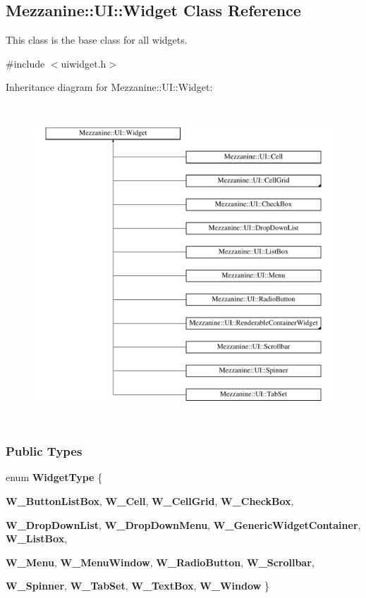 \hypertarget{classMezzanine_1_1UI_1_1Widget}{
\subsection{Mezzanine::UI::Widget Class Reference}
\label{classMezzanine_1_1UI_1_1Widget}
}


This class is the base class for all widgets.  




{\ttfamily \#include $<$uiwidget.h$>$}

Inheritance diagram for Mezzanine::UI::Widget:\begin{figure}[H]
\begin{center}
\leavevmode
\includegraphics[height=12.000000cm]{classMezzanine_1_1UI_1_1Widget}
\end{center}
\end{figure}
\subsubsection*{Public Types}
\begin{DoxyCompactItemize}
\item 
enum {\bfseries WidgetType} \{ \par
{\bfseries W\_\-ButtonListBox}, 
{\bfseries W\_\-Cell}, 
{\bfseries W\_\-CellGrid}, 
{\bfseries W\_\-CheckBox}, 
\par
{\bfseries W\_\-DropDownList}, 
{\bfseries W\_\-DropDownMenu}, 
{\bfseries W\_\-GenericWidgetContainer}, 
{\bfseries W\_\-ListBox}, 
\par
{\bfseries W\_\-Menu}, 
{\bfseries W\_\-MenuWindow}, 
{\bfseries W\_\-RadioButton}, 
{\bfseries W\_\-Scrollbar}, 
\par
{\bfseries W\_\-Spinner}, 
{\bfseries W\_\-TabSet}, 
{\bfseries W\_\-TextBox}, 
{\bfseries W\_\-Window}
 \}
\end{DoxyCompactItemize}
